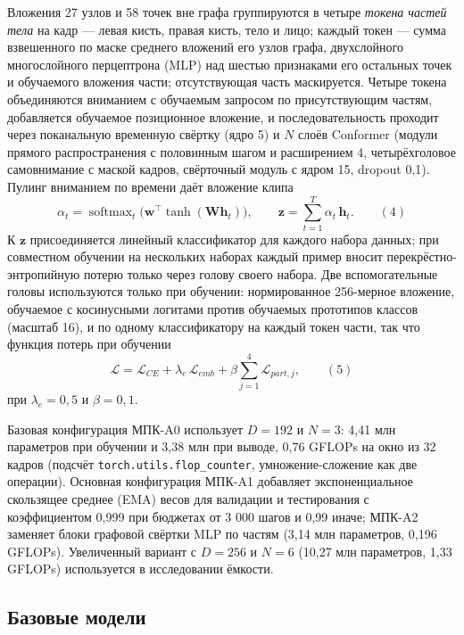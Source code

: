 \documentclass[a4paper,fleqn]{cas-dc}
\begin{document}
Вложения 27 узлов и 58 точек вне графа группируются в четыре \emph{токена частей тела} на кадр --- левая кисть, правая кисть, тело и лицо; каждый токен --- сумма взвешенного по маске среднего вложений его узлов графа, двухслойного многослойного перцептрона (MLP) над шестью признаками его остальных точек и обучаемого вложения части; отсутствующая часть маскируется. Четыре токена объединяются вниманием с обучаемым запросом по присутствующим частям, добавляется обучаемое позиционное вложение, и последовательность проходит через поканальную временную свёртку (ядро 5) и \(N\) слоёв Conformer \cite{2020_gulati_conformer} (модули прямого распространения с половинным шагом и расширением 4, четырёхголовое самовнимание с маской кадров, свёрточный модуль с ядром 15, dropout 0,1). Пулинг вниманием по времени даёт вложение клипа \[\alpha_{t} = \operatorname{softmax}_{t}\big(\mathbf{w}^{\top}\tanh(\mathbf{W}\mathbf{h}_{t})\big),\qquad \mathbf{z} = \sum_{t=1}^{T}\alpha_{t}\,\mathbf{h}_{t}.\qquad(4)\] К \(\mathbf{z}\) присоединяется линейный классификатор для каждого набора данных; при совместном обучении на нескольких наборах каждый пример вносит перекрёстно-энтропийную потерю только через голову своего набора. Две вспомогательные головы используются только при обучении: нормированное 256-мерное вложение, обучаемое с косинусными логитами против обучаемых прототипов классов (масштаб 16), и по одному классификатору на каждый токен части, так что функция потерь при обучении \[\mathcal{L} = \mathcal{L}_{CE} + \lambda_{e}\,\mathcal{L}_{emb} + \beta\sum_{j=1}^{4}\mathcal{L}_{part,j},\qquad(5)\] при \(\lambda_e = 0{,}5\) и \(\beta = 0{,}1\).

Базовая конфигурация МПК-A0 использует \(D = 192\) и \(N = 3\): 4,41 млн параметров при обучении и 3,38 млн при выводе, 0,76 GFLOPs на окно из 32 кадров (подсчёт \texttt{torch.utils.flop\_counter}, умножение-сложение как две операции). Основная конфигурация МПК-A1 добавляет экспоненциальное скользящее среднее (EMA) весов для валидации и тестирования \cite{1992_polyak_averaging} с коэффициентом 0,999 при бюджетах от 3 000 шагов и 0,99 иначе; МПК-A2 заменяет блоки графовой свёртки MLP по частям (3,14 млн параметров, 0,196 GFLOPs). Увеличенный вариант с \(D = 256\) и \(N = 6\) (10,27 млн параметров, 1,33 GFLOPs) используется в исследовании ёмкости.

\hypertarget{ux431ux430ux437ux43eux432ux44bux435-ux43cux43eux434ux435ux43bux438}{%
\subsection{Базовые модели}\label{ux431ux430ux437ux43eux432ux44bux435-ux43cux43eux434ux435ux43bux438}}
\end{document}
